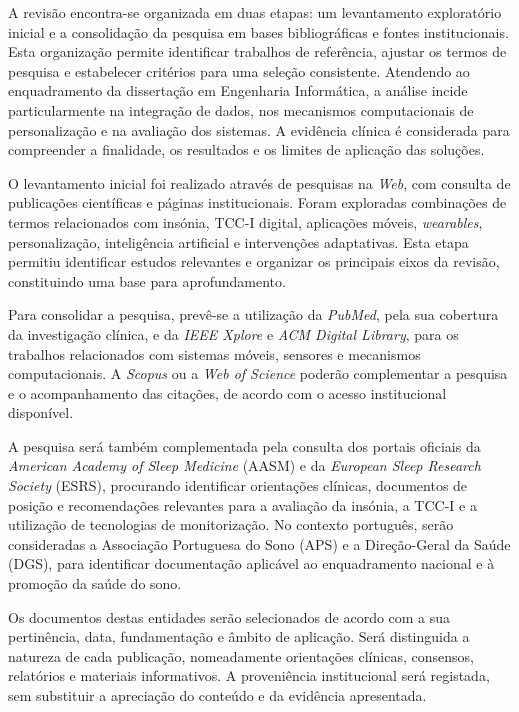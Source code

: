 A revisão encontra-se organizada em duas etapas: um levantamento exploratório inicial e a consolidação da pesquisa em bases bibliográficas e fontes institucionais. Esta organização permite identificar trabalhos de referência, ajustar os termos de pesquisa e estabelecer critérios para uma seleção consistente. Atendendo ao enquadramento da dissertação em Engenharia Informática, a análise incide particularmente na integração de dados, nos mecanismos computacionais de personalização e na avaliação dos sistemas. A evidência clínica é considerada para compreender a finalidade, os resultados e os limites de aplicação das soluções.

O levantamento inicial foi realizado através de pesquisas na \textit{Web}, com consulta de publicações científicas e páginas institucionais. Foram exploradas combinações de termos relacionados com insónia, TCC-I digital, aplicações móveis, \textit{wearables}, personalização, inteligência artificial e intervenções adaptativas. Esta etapa permitiu identificar estudos relevantes e organizar os principais eixos da revisão, constituindo uma base para aprofundamento.

Para consolidar a pesquisa, prevê-se a utilização da \textit{PubMed}, pela sua cobertura da investigação clínica, e da \textit{IEEE Xplore} e \textit{ACM Digital Library}, para os trabalhos relacionados com sistemas móveis, sensores e mecanismos computacionais. A \textit{Scopus} ou a \textit{Web of Science} poderão complementar a pesquisa e o acompanhamento das citações, de acordo com o acesso institucional disponível.

A pesquisa será também complementada pela consulta dos portais oficiais da \textit{American Academy of Sleep Medicine} (AASM) e da \textit{European Sleep Research Society} (ESRS), procurando identificar orientações clínicas, documentos de posição e recomendações relevantes para a avaliação da insónia, a TCC-I e a utilização de tecnologias de monitorização. No contexto português, serão consideradas a Associação Portuguesa do Sono (APS) e a Direção-Geral da Saúde (DGS), para identificar documentação aplicável ao enquadramento nacional e à promoção da saúde do sono.

Os documentos destas entidades serão selecionados de acordo com a sua pertinência, data, fundamentação e âmbito de aplicação. Será distinguida a natureza de cada publicação, nomeadamente orientações clínicas, consensos, relatórios e materiais informativos. A proveniência institucional será registada, sem substituir a apreciação do conteúdo e da evidência apresentada.

